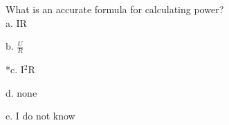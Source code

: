 
What is an accurate formula for calculating power? \\

a. IR

b. \(\frac{U}{R}\)

*c. I$^{2}$R

d. none

e. I do not know \\
